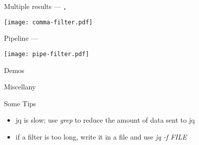 \documentclass{beamer}
\renewcommand\big[1]{
  \begin{center}
    \Large{#1}
  \end{center}
}
\begin{document}
\begin{frame}[fragile]
  \big{Multiple results --- \texttt{,}}
  \begin{center}
    \texttt{[image: comma-filter.pdf]}
  \end{center}
\end{frame}

\begin{frame}[fragile]
  \big{Pipeline --- \texttt{\textpipe}}
  \begin{center}
    \texttt{[image: pipe-filter.pdf]}
  \end{center}
\end{frame}

\begin{frame}
  \centering\Huge{Demos}
\end{frame}

\begin{frame}
  \centering\Huge{Miscellany}
\end{frame}

\begin{frame}
  \big{Some Tips}

  \begin{itemize}
    \item jq is slow; use \textit{grep} to reduce the amount of data sent to jq
    \item if a filter is too long, write it in a file and use \textit{jq -f FILE}
  \end{itemize}
\end{frame}
\end{document}
